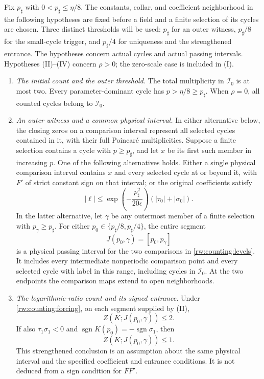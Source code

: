 Fix $p_\sharp$ with $0<p_\sharp\le\eta/8$.  The constants, collar,
and coefficient neighborhood in the following hypotheses are fixed
before a field and a finite selection of its cycles are chosen.  Three
distinct thresholds will be used: $p_\sharp$ for an outer witness,
$p_\sharp/8$ for the small-cycle trigger, and $p_\sharp/4$ for
uniqueness and the strengthened entrance.  The hypotheses concern
actual cycles and actual passing intervals.
Hypotheses (II)--(IV) concern $\rho>0$; the zero-scale case is included
in (I).

\begin{enumerate}
\item[\textup{(I)}] \emph{The initial count and the outer threshold.}
The total multiplicity in $\mathcal I_0$ is at most two.
Every parameter-dominant cycle has $p>\eta/8\ge p_\sharp$.
When $\rho=0$, all counted cycles belong to $\mathcal I_0$.

\item[\textup{(II)}] \emph{An outer witness and a common physical interval.}
In either alternative below, the closing zeros on a comparison interval
represent all selected cycles contained in it, with their full
Poincar\'e multiplicities.
Suppose a finite selection contains a cycle with $p\ge p_\sharp$,
and let $x$ be its first such member in increasing $p$.  One of the
following alternatives holds.  Either a single physical comparison interval
contains $x$ and every selected cycle at or beyond it, with $F'$ of
strict constant sign on that interval; or the original coefficients
satisfy
\begin{equation}\label{rw:counting:forcing}
 |\ell|\le
 \exp\!\left(-\frac{p_\sharp^2}{20\epsilon}\right)
 (|\tau_0|+|\sigma_0|).
\end{equation}
In the latter alternative, let $\gamma$ be any outermost member of a
finite selection with $p_\gamma\ge p_\sharp$.  For either
$p_0\in\{p_\sharp/8,p_\sharp/4\}$, the entire segment
\[
 J(p_0,\gamma)=[p_0,p_\gamma]
\]
is a physical passing interval for the two comparisons in
\eqref{rw:counting:levels}.  It includes every intermediate nonperiodic
comparison point and every selected cycle with label in this range,
including cycles in $\mathcal I_0$.  At the two endpoints the comparison
maps extend to open neighborhoods.

\item[\textup{(III)}] \emph{The logarithmic-ratio count and its signed entrance.}
Under \eqref{rw:counting:forcing}, on each segment supplied by (II),
\[
 Z(K;J(p_0,\gamma))\le2.
\]
If also $\tau_1\sigma_1<0$ and
$\operatorname{sgn}K(p_0)=-\operatorname{sgn}\sigma_1$, then
\[
 Z(K;J(p_0,\gamma))\le1.
\]
This strengthened conclusion is an assumption about the same physical
interval and the specified coefficient and entrance conditions.  It is
not deduced from a sign condition for $FF'$.


\end{enumerate}

